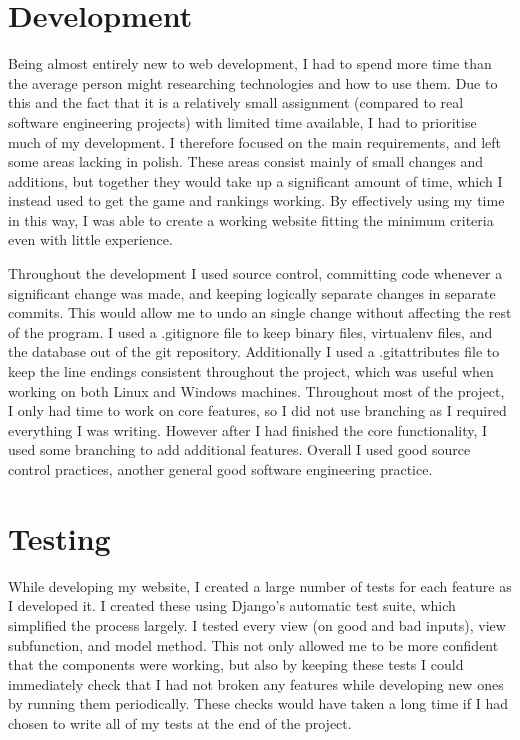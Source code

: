 \documentclass{article}
\begin{document}
\section{Development}

Being almost entirely new to web development, I had to spend more time than the average person might researching technologies and how to use them. Due to this and the fact that it is a relatively small assignment (compared to real software engineering projects) with limited time available, I had to prioritise much of my development. I therefore focused on the main requirements, and left some areas lacking in polish. These areas consist mainly of small changes and additions, but together they would take up a significant amount of time, which I instead used to get the game and rankings working. By effectively using my time in this way, I was able to create a working website fitting the minimum criteria even with little experience.

Throughout the development I used source control, committing code whenever a significant change was made, and keeping logically separate changes in separate commits. This would allow me to undo an single change without affecting the rest of the program. I used a .gitignore file to keep binary files, virtualenv files, and the database out of the git repository. Additionally I used a .gitattributes file to keep the line endings consistent throughout the project, which was useful when working on both Linux and Windows machines. Throughout most of the project, I only had time to work on core features, so I did not use branching as I required everything I was writing. However after I had finished the core functionality, I used some branching to add additional features. Overall I used good source control practices, another general good software engineering practice.

\section{Testing}

While developing my website, I created a large number of tests for each feature as I developed it. I created these using Django's automatic test suite, which simplified the process largely. I tested every view (on good and bad inputs), view subfunction, and model method. This not only allowed me to be more confident that the components were working, but also by keeping these tests I could immediately check that I had not broken any features while developing new ones by running them periodically. These checks would have taken a long time if I had chosen to write all of my tests at the end of the project.
\end{document}

